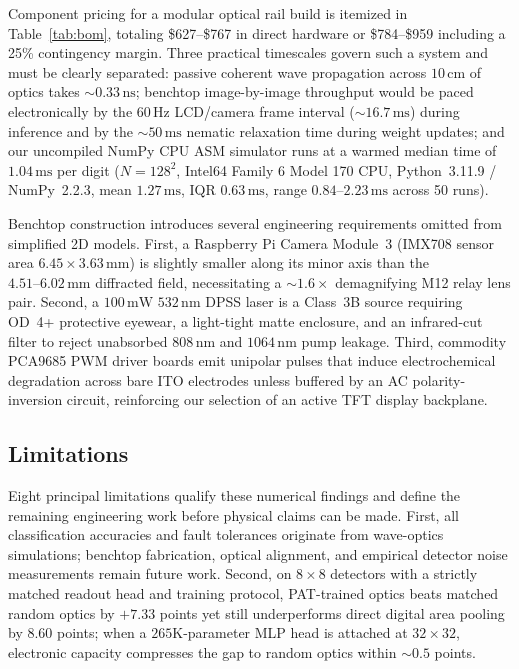 \documentclass[journal]{IEEEtran}
\begin{document}
Component pricing for a modular optical rail build is itemized in Table~\ref{tab:bom}, totaling \$627--\$767 in direct hardware or \$784--\$959 including a 25\% contingency margin. Three practical timescales govern such a system and must be clearly separated: passive coherent wave propagation across $10\,\text{cm}$ of optics takes $\sim 0.33\,\text{ns}$; benchtop image-by-image throughput would be paced electronically by the $60\,\text{Hz}$ LCD/camera frame interval ($\sim 16.7\,\text{ms}$) during inference and by the $\sim 50\,\text{ms}$ nematic relaxation time during weight updates; and our uncompiled NumPy CPU ASM simulator runs at a warmed median time of $1.04\,\text{ms}$ per digit ($N=128^2$, Intel64 Family 6 Model 170 CPU, Python~3.11.9 / NumPy~2.2.3, mean $1.27\,\text{ms}$, IQR $0.63\,\text{ms}$, range $0.84\text{--}2.23\,\text{ms}$ across 50 runs).

Benchtop construction introduces several engineering requirements omitted from simplified 2D models. First, a Raspberry Pi Camera Module~3 (IMX708 sensor area $6.45 \times 3.63\,\text{mm}$) is slightly smaller along its minor axis than the $4.51\text{--}6.02\,\text{mm}$ diffracted field, necessitating a $\sim 1.6\times$ demagnifying M12 relay lens pair. Second, a $100\,\text{mW}$ $532\,\text{nm}$ DPSS laser is a Class~3B source requiring OD~4+ protective eyewear, a light-tight matte enclosure, and an infrared-cut filter to reject unabsorbed $808\,\text{nm}$ and $1064\,\text{nm}$ pump leakage. Third, commodity PCA9685 PWM driver boards emit unipolar pulses that induce electrochemical degradation across bare ITO electrodes unless buffered by an AC polarity-inversion circuit, reinforcing our selection of an active TFT display backplane.

\subsection{Limitations}
Eight principal limitations qualify these numerical findings and define the remaining engineering work before physical claims can be made. First, all classification accuracies and fault tolerances originate from wave-optics simulations; benchtop fabrication, optical alignment, and empirical detector noise measurements remain future work. Second, on $8\times 8$ detectors with a strictly matched readout head and training protocol, PAT-trained optics beats matched random optics by $+7.33$ points yet still underperforms direct digital area pooling by $8.60$ points; when a $265\text{K}$-parameter MLP head is attached at $32\times 32$, electronic capacity compresses the gap to random optics within $\sim 0.5$ points.
\end{document}

